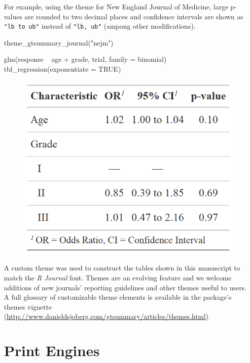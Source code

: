 For example, using the theme for New England Journal of Medicine, large p-values are rounded to two decimal places and confidence intervals are shown as \texttt{"lb to ub"} instead of \texttt{"lb, ub"} (ampong other modifications). 

\begin{example}
theme_gtsummary_journal("nejm")

glm(response ~ age + grade, trial, family = binomial) %
  tbl_regression(exponentiate = TRUE)
\end{example}

\begin{figure}[h!]
  \includegraphics[scale=0.28]{nejm.png}
  \centering
\end{figure}

A custom theme was used to construct the  tables shown in this manuscript to match the \emph{R Journal} font. 
Themes are an evolving feature and we welcome additions of new journals' reporting guidelines and other themes useful to users.
A full glossary of customizable theme elements is available in the package's themes vignette (\url{http://www.danieldsjoberg.com/gtsummary/articles/themes.html}).

\section{Print Engines}


